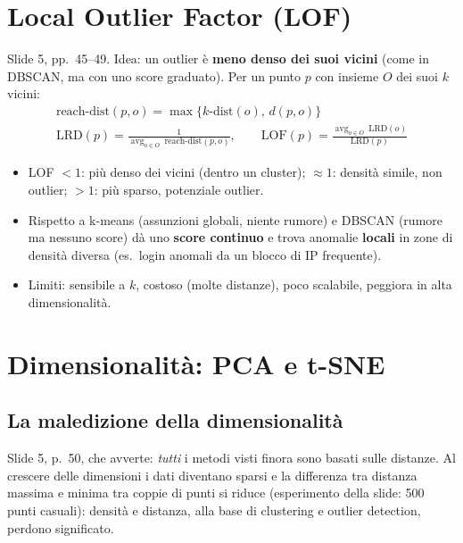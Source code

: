 \section{Local Outlier Factor (LOF)}
Slide 5, pp.\ 45--49. Idea: un outlier è \textbf{meno denso dei suoi vicini} (come in DBSCAN, ma con uno score graduato). Per un punto $p$
con insieme $O$ dei suoi $k$ vicini:
\begin{gather*}
\text{reach-dist}(p,o) = \max\{k\text{-dist}(o),\, d(p,o)\}\\
\mathrm{LRD}(p) = \frac{1}{\operatorname{avg}_{o\in O}\ \text{reach-dist}(p,o)}, \qquad
\mathrm{LOF}(p) = \frac{\operatorname{avg}_{o\in O}\ \mathrm{LRD}(o)}{\mathrm{LRD}(p)}
\end{gather*}
\begin{itemize}
  \item LOF $<1$: più denso dei vicini (dentro un cluster); $\approx 1$: densità simile, non outlier; $>1$: più sparso, potenziale outlier.
  \item Rispetto a k-means (assunzioni globali, niente rumore) e DBSCAN (rumore ma nessuno score) dà uno \textbf{score continuo} e trova anomalie
        \textbf{locali} in zone di densità diversa (es.\ login anomali da un blocco di IP frequente).
  \item Limiti: sensibile a $k$, costoso (molte distanze), poco scalabile, peggiora in alta dimensionalità.
\end{itemize}

\section{Dimensionalità: PCA e t-SNE}
\subsection{La maledizione della dimensionalità}
Slide 5, p.~50, che avverte: \emph{tutti} i metodi visti finora sono basati sulle distanze. Al crescere delle dimensioni i dati diventano
sparsi e la differenza tra distanza massima e minima tra coppie di punti si riduce (esperimento della slide: 500 punti casuali): densità e
distanza, alla base di clustering e outlier detection, perdono significato.

